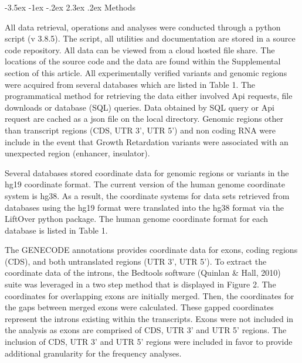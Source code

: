 \documentclass[11pt]{article}
\makeatletter
\renewcommand\section{\@startsection {section}{1}{\z@}%
                                       {-3.5ex \@plus -1ex \@minus -.2ex}%
                                       {2.3ex \@plus.2ex}%
                                       {\normalfont\fontfamily{phv}\fontsize{16}{19}\bfseries}}
\makeatother
\begin{document}
\section{Methods} \label{s:methods}

All data retrieval, operations and analyses were conducted through a python script (v 3.8.5). The script, all utilities and documentation are stored in a source code repository. All data can be viewed from a cloud hosted file share. The locations of the source code and the data are found within the Supplemental section of this article. All experimentally verified variants and genomic regions were acquired from several databases which are listed in Table 1. The programmatical method for retrieving the data either involved Api requests, file downloads or database (SQL) queries. Data obtained by SQL query or Api request are cached as a json file on the local directory. Genomic regions other than transcript regions (CDS, UTR 3’, UTR 5’) and non coding RNA were include in the event that Growth Retardation variants were associated with an unexpected region (enhancer, insulator). 

Several databases stored coordinate data for genomic regions or variants in the hg19 coordinate format. The current version of the human genome coordinate system is hg38. As a result, the coordinate systems for data sets retrieved from databases using the hg19 format were translated into the hg38 format via the LiftOver python package. The human genome coordinate format for each database is listed in Table 1. 

The GENECODE annotations provides coordinate data for exons, coding regions (CDS), and both untranslated regions (UTR 3’, UTR 5’). To extract the coordinate data of the introns, the Bedtools software (Quinlan & Hall, 2010) suite was leveraged in a two step method that is displayed in Figure 2. The coordinates for overlapping exons are initially merged. Then, the coordinates for the gaps between merged exons were calculated. These gapped coordinates represent the introns existing within the transcripts. Exons were not included in the analysis as exons are comprised of CDS, UTR 3’ and UTR 5’ regions. The inclusion of CDS, UTR 3’ and UTR 5’ regions were included in favor to provide additional granularity for the frequency analyses. 
\end{document}
